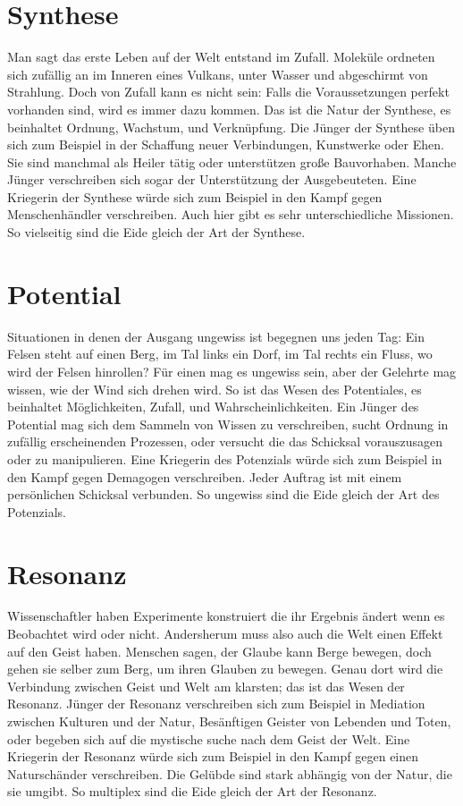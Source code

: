 \documentclass{book}
\begin{document}
\section{Synthese}
Man sagt das erste Leben auf der Welt entstand im Zufall. Moleküle ordneten sich zufällig an im Inneren eines Vulkans, unter Wasser und abgeschirmt von Strahlung. Doch von Zufall kann es nicht sein: Falls die Voraussetzungen perfekt vorhanden sind, wird es immer dazu kommen. Das ist die Natur der Synthese, es beinhaltet Ordnung, Wachstum, und Verknüpfung. Die Jünger der Synthese üben sich zum Beispiel in der Schaffung neuer Verbindungen, Kunstwerke oder Ehen. Sie sind manchmal als Heiler tätig oder unterstützen große Bauvorhaben. Manche Jünger verschreiben sich sogar der Unterstützung der Ausgebeuteten. Eine Kriegerin der Synthese würde sich zum Beispiel in den Kampf gegen Menschenhändler verschreiben. Auch hier gibt es sehr unterschiedliche Missionen. So vielseitig sind die Eide gleich der Art der Synthese.

\section{Potential}
Situationen in denen der Ausgang ungewiss ist begegnen uns jeden Tag: Ein Felsen steht auf einen Berg, im Tal links ein Dorf, im Tal rechts ein Fluss, wo wird der Felsen hinrollen? Für einen mag es ungewiss sein, aber der Gelehrte mag wissen, wie der Wind sich drehen wird. So ist das Wesen des Potentiales, es beinhaltet Möglichkeiten, Zufall, und Wahrscheinlichkeiten. Ein Jünger des Potential mag sich dem Sammeln von Wissen zu verschreiben, sucht Ordnung in zufällig erscheinenden Prozessen, oder versucht die das Schicksal vorauszusagen oder zu manipulieren. Eine Kriegerin des Potenzials würde sich zum Beispiel in den Kampf gegen Demagogen verschreiben. Jeder Auftrag ist mit einem persönlichen Schicksal verbunden. So ungewiss sind die Eide gleich der Art des Potenzials.

\section{Resonanz}
Wissenschaftler haben Experimente konstruiert die ihr Ergebnis ändert wenn es Beobachtet wird oder nicht. Andersherum muss also auch die Welt einen Effekt auf den Geist haben. Menschen sagen, der Glaube kann Berge bewegen, doch gehen sie selber zum Berg, um ihren Glauben zu bewegen. Genau dort wird die Verbindung zwischen Geist und Welt am klarsten; das ist das Wesen der Resonanz. Jünger der Resonanz verschreiben sich zum Beispiel in Mediation zwischen Kulturen und der Natur, Besänftigen Geister von Lebenden und Toten, oder begeben sich auf die mystische suche nach dem Geist der Welt. Eine Kriegerin der Resonanz würde sich zum Beispiel in den Kampf gegen einen Naturschänder verschreiben. Die Gelübde sind stark abhängig von der Natur, die sie umgibt. So multiplex sind die Eide gleich der Art der Resonanz.
\end{document}
